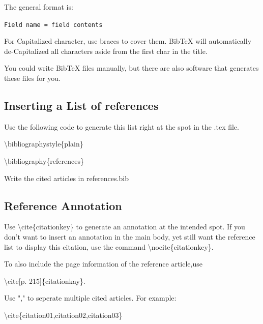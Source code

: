 \documentclass[a4paper,12pt]{article}
\begin{document}
The general format is:

\texttt{Field name = {field contents}}


For Capitalized character, use braces to cover them.
BibTeX will automatically de-Capitalized all characters aside from the first char in the title.

You could write BibTeX files manually, but there are also software that generates these files for you.

\subsection{Inserting a List of references}

Use the following code to generate this list right at the spot 
in the .tex file.

\textbackslash bibliographystyle\{plain\}

\textbackslash bibliography\{references\}

Write the cited articles in references.bib

\subsection{Reference Annotation}

Use \textbackslash cite\{citationkey\} to generate an annotation at the intended spot.
If you don't want to insert an annotation in the main body, yet still
want the reference list to display this citation,
use the command \textbackslash nocite\{citationkey\}.

To also include the page information of the reference article,use

\textbackslash cite[p. 215]\{citationkay\}.

Use "," to seperate multiple cited articles. For example:

\textbackslash cite\{citation01,citation02,citation03\}
\end{document}
